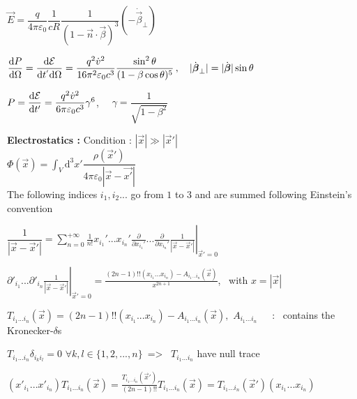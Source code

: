 \squishlist
\item $\vec{E} = \dfrac{q}{4\pi\varepsilon_0}\dfrac{1}{cR}\dfrac{1}{(1-\vec{n}\cdot\vec{\beta})^3}(-\dot{\vec{\beta}}_{\perp})$

\item $\dfrac{\textrm{d} P}{\textrm{d} \Omega} = \dfrac{\textrm{d} \mathcal{E}}{\textrm{d} t^{'}\textrm{d} \Omega} = \dfrac{q^2 \dot{v}^2}{16\pi^2\varepsilon_0c^3}\dfrac{\sin^2\theta}{(1-\beta\cos\theta)^5} \, , \quad |\dot{\mbox{\boldmath$\beta$}}_{\perp}| = |\dot{\mbox{\boldmath$\beta$}}|\sin\theta$

\item $P = \dfrac{\textrm{d} \mathcal{E}}{\textrm{d} t'} = \dfrac{q^2 \dot{v}^2}{6 \pi \varepsilon_0 c^3} \gamma^6$, $\quad \gamma = \dfrac{1}{\sqrt{1-\beta^2}}$
\squishend


\squishlist
\item \textbf{Electrostatics :} Condition : $|\vec{x}| \gg |\vec{x}'|$
\\

$\Phi(\vec{x}) = \displaystyle{\int_V} \text{d}^3 x' \dfrac{\rho(\vec{x}')}{4\pi\varepsilon_0|\vec{x}-\vec{x'}|}$ \\
The following indices $i_1,i_2...$ go from $1$ to $3$ and are summed following Einstein's convention

\item  $\dfrac{1}{|\vec{x} - \vec{x}'|} = \left. \sum_{n=0}^{+\infty} \frac{1}{n!} x_{i_1}'...x_{i_n}' \frac{\partial}{\partial x_{i_1}'}... \frac{\partial}{\partial x_{i_n}'} \frac{1}{|\vec{x} - \vec{x}'|} \right|_{\vec{x}' = 0}$

\item $\left. \partial'_{i_1}...\partial'_{i_n} \frac{1}{|\vec{x} - \vec{x}'|}\right|_{\vec{x}' = 0} = \frac{(2n-1)!! (x_{i_1}...x_{i_n}) - A_{i_1 ... i_n} (\vec{x})}{x^{2n+1}}$, \, with $x=|\vec{x}|$

\item $T_{i_1 ... i_n}(\vec{x}) = (2n-1)!! (x_{i_1} ... x_{i_n}) - A_{i_1 ... i_n} (\vec{x}), \, \,  A_{i_1...i_n} \, \quad $ : \, contains the Kronecker-$\delta$s

\item $T_{i_1...i_n} \delta_{i_k i_l} = 0 \,\, \forall k,l \in \{1,2,...,n\} \, $ => \, $T_{i_1...i_n}$ have null trace

\item $(x'_{i_1}...x'_{i_n}) T_{i_1 ... i_n}(\vec{x}) = \frac{T_{i_1 ... i_n}(\vec{x}')}{(2n-1)!!} T_{i_1 ... i_n}(\vec{x}) = T_{i_1...i_n}(\vec{x}') (x_{i_1}...x_{i_n})$


